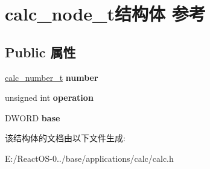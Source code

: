 \hypertarget{structcalc__node__t}{}\section{calc\+\_\+node\+\_\+t结构体 参考}
\label{structcalc__node__t}
\subsection*{Public 属性}
\begin{DoxyCompactItemize}
\item 
\mbox{\label{structcalc__node__t_a9e27e04d408703f0baabae0b78adf19c}} 
\hyperlink{unioncalc__number__t}{calc\+\_\+number\+\_\+t} {\bfseries number}
\item 
\mbox{\label{structcalc__node__t_a2ff9007b0f4acca7c1c99a3189d2ee07}} 
unsigned int {\bfseries operation}
\item 
\mbox{\label{structcalc__node__t_adc1de47fb2f8ad41d3568eddc927cf73}} 
D\+W\+O\+RD {\bfseries base}
\end{DoxyCompactItemize}


该结构体的文档由以下文件生成\+:\begin{DoxyCompactItemize}
\item 
E\+:/\+React\+O\+S-\/0../base/applications/calc/calc.\+h\end{DoxyCompactItemize}
